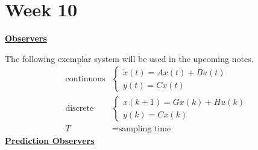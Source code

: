 \section{Week 10}
\begin{center}
    \textbf{\Large \underline{Observers}}
\end{center}
The following exemplar system will be used in the upcoming notes.
\begin{align*}
    \text{continuous} &\begin{cases}
        \dot{x}(t) = A x(t) + B u(t) \\
        y(t) = C x(t) 
    \end{cases} \\
    \text{discrete} &\begin{cases}
        x(k+1) = G x(k) + H u(k) \\
        y(k) = C x(k)
    \end{cases} \\
    T &= \text{sampling time}
\end{align*}
\textbf{\large \underline{Prediction Observers}}
